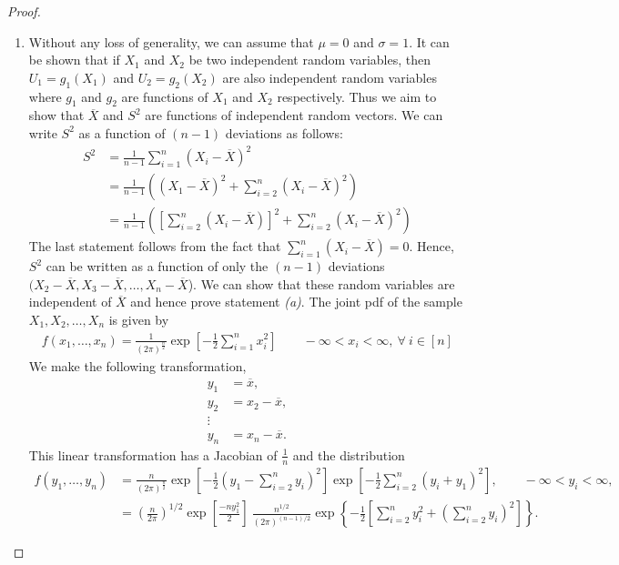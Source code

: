 \documentclass[a4paper,english,12pt]{article}
\begin{document}
\begin{proof}
\renewcommand{\labelenumi}{\alph{enumi})}
\begin{enumerate}
\item Without any loss of generality, we can assume that $\mu=0$ and $\sigma=1$. It can be shown that if $X_1$ and $X_2$ be two independent random variables, then $U_1=g_1(X_1)$ and $U_2=g_2(X_2)$ are also independent random variables where $g_1$ and $g_2$ are functions of $X_1$ and $X_2$ respectively. Thus we aim to show that $\overline{X}$ and $S^2$ are functions of independent random vectors.   
We can write $S^2$ as a function of $(n-1)$ deviations as follows: 
\begin{align}
S^2&=\frac{1}{n-1}\sum_{i=1}^n(X_i-\overline{X})^2 \nonumber \\
&= \frac{1}{n-1}\left((X_1-\overline{X})^2+\sum_{i=2}^n
(X_i-\overline{X})^2\right) \nonumber \\
&=\frac{1}{n-1}\left(\left[\sum_{i=2}^n(X_i-\overline{X})\right]^2+\sum_{i=2}^n(X_i-\overline{X})^2\right)
\end{align}
The last statement follows from the fact that $\sum_{i=1}^n(X_i-\overline{X})=0$. Hence, $S^2$ can be written as a function of only the $(n-1)$ deviations   $(X_2-\overline{X},X_3-\overline{X},\dots,X_n-\overline{X}$). We can show that these random variables are independent of $\overline{X}$ and hence prove statement \textit{(a)}. The joint pdf of the sample $X_1,X_2,\dots,X_n$ is given by 
\begin{align}
f(x_1,\dots,x_n)=\frac{1}{{(2\pi)}^{\frac{n}{2}}}\exp\left[-\frac{1}{2}\sum_{i=1}^n x_i^2\right]  \qquad - \infty <x_i< \infty,~\forall~i\in [n]
\end{align}
We make the following transformation, 
\begin{align}
y_1&=\overline{x},  \nonumber \\
y_2&=x_2-\overline{x}, \nonumber \\
\vdots \nonumber \\
y_n&=x_n-\overline{x}.
\end{align}
This linear transformation has a Jacobian of $\frac{1}{n}$ and the distribution 
\begin{align}
f(y_1,\dots ,y_n)
&= \frac{n}{{(2\pi)}^{\frac{n}{2}}}\exp\left[-\frac{1}{2}(y_1-\sum_{i=2}^ny_i)^2\right]\exp\left[-\frac{1}{2}\sum_{i=2}^n(y_i+y_1)^2\right], \qquad - \infty < y_i <\infty, \nonumber \\
&=  {\left( \frac{n}{2\pi}\right)}^{1/2}\exp\left[\frac{-ny_1^2}{2}\right]~  \frac{n^{1/2}}{(2\pi)^{(n-1)/2}}\exp\left\lbrace-\frac{1}{2}\left[{\sum_{i=2}^ny_i^2+\left(\sum_{i=2}^ny_i\right)^2}\right]\right\rbrace.

\end{align}
\end{enumerate}
\end{proof}
\end{document}
